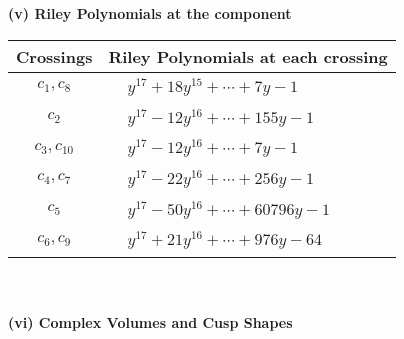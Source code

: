\documentclass[1p]{elsarticle_modified}
\theoremstyle{definition}
\begin{document}
\newpage\renewcommand{\arraystretch}{1}
\flushleft \textbf{(v) Riley Polynomials at the component}\newline \\
\begin{tabular}{m{50pt}|m{274pt}}
Crossings & \hspace{64pt}Riley Polynomials at each crossing \\
\hline $$\begin{aligned}c_{1},c_{8}\end{aligned}$$&$\begin{aligned}
&y^{17}+18 y^{15}+\cdots+7 y-1
\end{aligned}$\\
\hline $$\begin{aligned}c_{2}\end{aligned}$$&$\begin{aligned}
&y^{17}-12 y^{16}+\cdots+155 y-1
\end{aligned}$\\
\hline $$\begin{aligned}c_{3},c_{10}\end{aligned}$$&$\begin{aligned}
&y^{17}-12 y^{16}+\cdots+7 y-1
\end{aligned}$\\
\hline $$\begin{aligned}c_{4},c_{7}\end{aligned}$$&$\begin{aligned}
&y^{17}-22 y^{16}+\cdots+256 y-1
\end{aligned}$\\
\hline $$\begin{aligned}c_{5}\end{aligned}$$&$\begin{aligned}
&y^{17}-50 y^{16}+\cdots+60796 y-1
\end{aligned}$\\
\hline $$\begin{aligned}c_{6},c_{9}\end{aligned}$$&$\begin{aligned}
&y^{17}+21 y^{16}+\cdots+976 y-64
\end{aligned}$\\
\hline
\end{tabular}\\~\\
\newpage\flushleft \textbf{(vi) Complex Volumes and Cusp Shapes}
\end{document}
